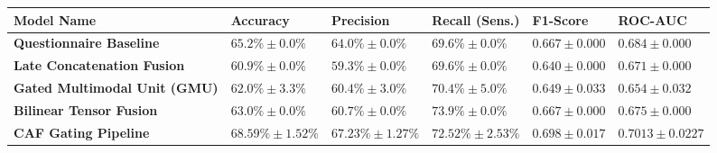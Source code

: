 \documentclass[
]{article}
\newcounter{none} %
\begin{document}
{\def\LTcaptype{none} %
\begin{longtable}[]{@{}
  >{\raggedright\arraybackslash}p{}
  >{\centering\arraybackslash}p{}
  >{\centering\arraybackslash}p{}
  >{\centering\arraybackslash}p{}
  >{\centering\arraybackslash}p{}
  >{\centering\arraybackslash}p{}@{}}
\toprule\noalign{}
\begin{minipage}[b]{\linewidth}\raggedright
Model Name
\end{minipage} & \begin{minipage}[b]{\linewidth}\centering
Accuracy
\end{minipage} & \begin{minipage}[b]{\linewidth}\centering
Precision
\end{minipage} & \begin{minipage}[b]{\linewidth}\centering
Recall (Sens.)
\end{minipage} & \begin{minipage}[b]{\linewidth}\centering
F1-Score
\end{minipage} & \begin{minipage}[b]{\linewidth}\centering
ROC-AUC
\end{minipage} \\
\midrule\noalign{}
\endhead
\bottomrule\noalign{}
\endlastfoot
\textbf{Questionnaire Baseline} & \(65.2\% \pm 0.0\%\) &
\(64.0\% \pm 0.0\%\) & \(69.6\% \pm 0.0\%\) & \(0.667 \pm 0.000\) &
\(0.684 \pm 0.000\) \\
\textbf{Late Concatenation Fusion} & \(60.9\% \pm 0.0\%\) &
\(59.3\% \pm 0.0\%\) & \(69.6\% \pm 0.0\%\) & \(0.640 \pm 0.000\) &
\(0.671 \pm 0.000\) \\
\textbf{Gated Multimodal Unit (GMU)} & \(62.0\% \pm 3.3\%\) &
\(60.4\% \pm 3.0\%\) & \(70.4\% \pm 5.0\%\) & \(0.649 \pm 0.033\) &
\(0.654 \pm 0.032\) \\
\textbf{Bilinear Tensor Fusion} & \(63.0\% \pm 0.0\%\) &
\(60.7\% \pm 0.0\%\) & \(73.9\% \pm 0.0\%\) & \(0.667 \pm 0.000\) &
\(0.675 \pm 0.000\) \\
\textbf{CAF Gating Pipeline} & \textbf{\(68.59\% \pm 1.52\%\)} &
\textbf{\(67.23\% \pm 1.27\%\)} & \textbf{\(72.52\% \pm 2.53\%\)} &
\textbf{\(0.698 \pm 0.017\)} & \textbf{\(0.7013 \pm 0.0227\)} \\
\end{longtable}
}
\end{document}
